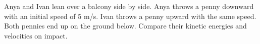         Anya and Ivan lean over a balcony side by side. Anya throws a penny downward with
        an initial speed of 5 m/s. Ivan throws a penny upward with the same speed. Both pennies
        end up on the ground below. Compare their kinetic energies and velocities on impact.
